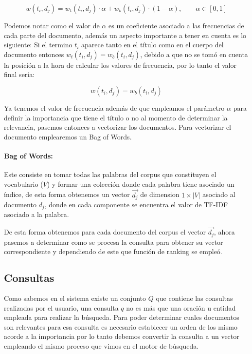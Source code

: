 \documentclass[runningheads,a4paper]{llncs}
\begin{document}
\begin{equation}
	w(t_i, d_j) = w_t(t_i, d_j) · \alpha + w_b(t_i, d_j) · (1 - \alpha), \qquad \alpha \in [0, 1]
\end{equation}

Podemos notar como el valor de $\alpha$ es un coeficiente asociado a las frecuencias de cada parte del documento, además un aspecto importante a tener en cuenta es lo siguiente: Si el termino $t_i$ aparece tanto en el título como en el cuerpo del documento entonces $w_t(t_i, d_j) = w_b(t_i, d_j)$, debido a que no se tomó en cuenta la posición a la hora de calcular los valores de frecuencia, por lo tanto el valor final sería: 

\begin{equation}
	w(t_i, d_j) = w_b(t_i, d_j)
\end{equation}

Ya tenemos el valor de frecuencia además de que empleamos el parámetro  $\alpha$ para definir la importancia que tiene el título o no al momento de determinar la relevancia, pasemos entonces a vectorizar los documentos. Para vectorizar el documento emplearemos un Bag of Words.

\paragraph*{Bag of Words:} Este consiste en tomar todas las palabras del corpus que constituyen el vocabulario ($V$) y formar una colección donde cada palabra tiene asociado un índice, de esta forma obtenemos un vector $\overrightarrow{d_j}$ de dimension $1 \times |V|$ asociado al documento $d_j$, donde en cada componente se encuentra el valor de TF-IDF asociado a la palabra.

De esta forma obtenemos para cada documento del corpus el vector $\overrightarrow{d_j}$, ahora pasemos a determinar como se procesa la consulta para obtener su vector correspondiente y dependiendo de este que función de ranking se empleó.

\subsection*{Consultas}

Como sabemos en el sistema existe un conjunto $Q$ que contiene las consultas realizadas por el usuario, una consulta $q$ no es más que una oración u entidad empleada para realizar la búsqueda. Para poder determinar cuales documentos son relevantes para esa consulta es necesario establecer un orden de los mismo acorde a la importancia por lo tanto debemos convertir la consulta a un vector empleando el mismo proceso que vimos en el motor de búsqueda.
\end{document}
